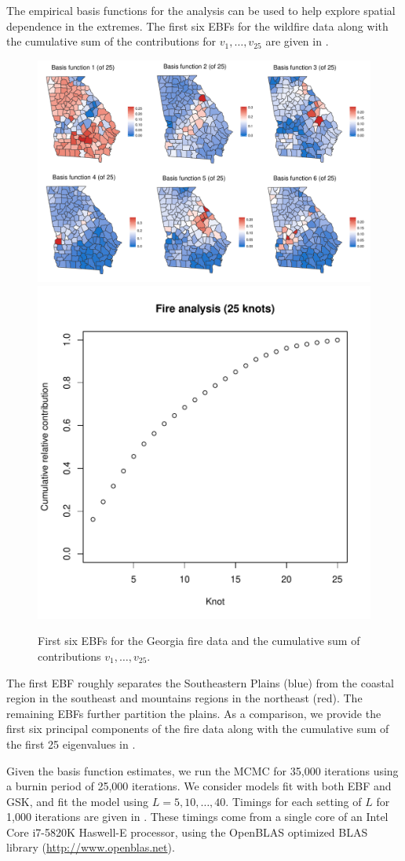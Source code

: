 The empirical basis functions for the analysis can be used to help explore spatial dependence in the extremes.
The first six EBFs for the wildfire data along with the cumulative sum of the contributions for $v_1, \ldots, v_{25}$ are given in .
\begin{figure}[htbp] %
  \centering
  \includegraphics[width=\linewidth]{plots/fire-ebf-panel.pdf}\\
  \includegraphics[width=0.45\linewidth]{plots/firev-25.pdf}
  \caption{First six EBFs for the Georgia fire data and the cumulative sum of contributions $v_1, \ldots, v_{25}$.}
  \label{ebfig:fire-ebfpanel}
\end{figure}
The first EBF roughly separates the Southeastern Plains (blue) from the coastal region in the southeast and mountains regions in the northeast (red).
The remaining EBFs further partition the plains.
As a comparison, we provide the first six principal components of the fire data along with the cumulative sum of the first 25 eigenvalues in .

Given the basis function estimates, we run the MCMC for 35,000 iterations using a burnin period of 25,000 iterations.
We consider models fit with both EBF and GSK, and fit the model using $L = 5, 10, \ldots, 40$.
Timings for each setting of $L$ for 1,000 iterations are given in .
These timings come from a single core of an Intel Core i7-5820K Haswell-E processor, using the OpenBLAS optimized BLAS library (\url{http://www.openblas.net}).


